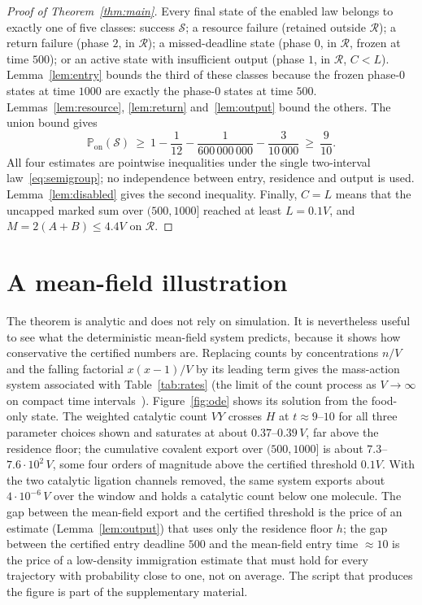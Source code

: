 \documentclass[11pt,a4paper]{article}
\theoremstyle{plain}
\theoremstyle{definition}
\theoremstyle{remark}
\newcommand{\Prob}{\mathbb P}
\newcommand{\R}{\mathcal R}
\newcommand{\Son}{\mathcal S}
\begin{document}
\begin{proof}[Proof of Theorem~\ref{thm:main}]
Every final state of the enabled law belongs to exactly one of five classes: success $\Son$; a resource failure (retained outside $\R$); a return failure (phase $2$, in $\R$); a missed-deadline state (phase $0$, in $\R$, frozen at time $500$); or an active state with insufficient output (phase $1$, in $\R$, $C<L$). Lemma~\ref{lem:entry} bounds the third of these classes because the frozen phase-$0$ states at time $1000$ are exactly the phase-$0$ states at time $500$. Lemmas~\ref{lem:resource}, \ref{lem:return} and~\ref{lem:output} bound the others. The union bound gives
\begin{equation}\label{eq:union}
\Prob_{\mathrm{on}}(\Son)\ \ge\ 1-\frac1{12}-\frac1{600\,000\,000}-\frac3{10\,000}\ \ge\ \frac9{10}.
\end{equation}
All four estimates are pointwise inequalities under the single two-interval law~\eqref{eq:semigroup}; no independence between entry, residence and output is used. Lemma~\ref{lem:disabled} gives the second inequality. Finally, $C=L$ means that the uncapped marked sum over $(500,1000]$ reached at least $L=0.1V$, and $M=2(A+B)\le4.4V$ on $\R$.
\end{proof}

\section{A mean-field illustration}\label{sec:meanfield}

The theorem is analytic and does not rely on simulation. It is nevertheless useful to see what the deterministic mean-field system predicts, because it shows how conservative the certified numbers are. Replacing counts by concentrations $n/V$ and the falling factorial $x(x-1)/V$ by its leading term gives the mass-action system associated with Table~\ref{tab:rates} (the limit of the count process as $V\to\infty$ on compact time intervals~\citep{kurtz1972}). Figure~\ref{fig:ode} shows its solution from the food-only state. The weighted catalytic count $VY$ crosses $H$ at $t\approx9$--$10$ for all three parameter choices shown and saturates at about $0.37$--$0.39\,V$, far above the residence floor; the cumulative covalent export over $(500,1000]$ is about $7.3$--$7.6\cdot10^2\,V$, some four orders of magnitude above the certified threshold $0.1V$. With the two catalytic ligation channels removed, the same system exports about $4\cdot10^{-6}\,V$ over the window and holds a catalytic count below one molecule. The gap between the mean-field export and the certified threshold is the price of an estimate (Lemma~\ref{lem:output}) that uses only the residence floor $h$; the gap between the certified entry deadline $500$ and the mean-field entry time $\approx10$ is the price of a low-density immigration estimate that must hold for every trajectory with probability close to one, not on average. The script that produces the figure is part of the supplementary material.
\end{document}
